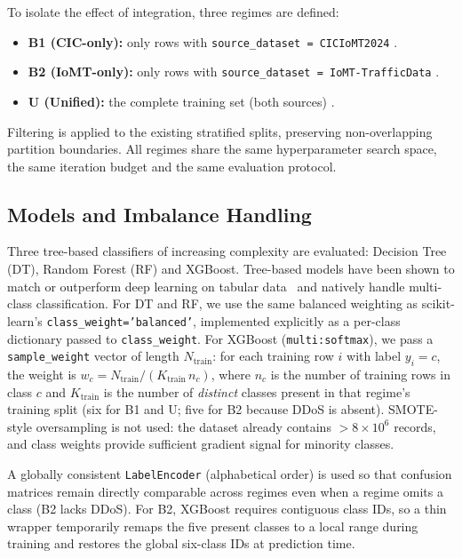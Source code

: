 \documentclass[runningheads]{llncs}
\begin{document}
To isolate the effect of integration, three regimes are defined:
\begin{itemize}[nosep,leftmargin=*]
  \item \textbf{B1 (CIC-only):} only rows with \texttt{source\_dataset = CICIoMT2024} \cite{dadkhah2024ciciomt}.
  \item \textbf{B2 (IoMT-only):} only rows with \texttt{source\_dataset = IoMT-TrafficData} \cite{areia2024iomt}.
  \item \textbf{U (Unified):} the complete training set (both sources) \cite{pantelis2026_unified_dataset}.
\end{itemize}
Filtering is applied to the existing stratified splits, preserving non-overlapping partition boundaries. All regimes share the same hyperparameter search space, the same iteration budget and the same evaluation protocol.

\subsection{Models and Imbalance Handling}

Three tree-based classifiers of increasing complexity are evaluated: Decision Tree (DT), Random Forest (RF) and XGBoost. Tree-based models have been shown to match or outperform deep learning on tabular data~\cite{grinsztajn2022tree} and natively handle multi-class classification. For DT and RF, we use the same balanced weighting as scikit-learn's \texttt{class\_weight='balanced'}, implemented explicitly as a per-class dictionary passed to \texttt{class\_weight}. For XGBoost (\texttt{multi:softmax}), we pass a \texttt{sample\_weight} vector of length $N_{\mathrm{train}}$: for each training row $i$ with label $y_i=c$, the weight is $w_c = N_{\mathrm{train}}/(K_{\mathrm{train}}\,n_c)$, where $n_c$ is the number of training rows in class $c$ and $K_{\mathrm{train}}$ is the number of \emph{distinct} classes present in that regime's training split (six for B1 and U; five for B2 because DDoS is absent). SMOTE-style oversampling is not used: the dataset already contains $>8 \times 10^{6}$ records, and class weights provide sufficient gradient signal for minority classes.

A globally consistent \texttt{LabelEncoder} (alphabetical order) is used so that confusion matrices remain directly comparable across regimes even when a regime omits a class (B2 lacks DDoS). For B2, XGBoost requires contiguous class IDs, so a thin wrapper temporarily remaps the five present classes to a local range during training and restores the global six-class IDs at prediction time.
\end{document}

